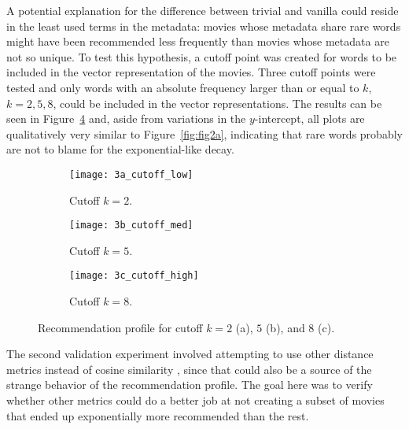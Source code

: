 
A potential explanation for the difference between trivial and vanilla could
reside in the least used terms in the metadata: movies whose metadata share rare
words might have been recommended less frequently than movies whose metadata are
not so unique. To test this hypothesis, a cutoff point was created for words to
be included in the vector representation of the movies. Three cutoff points were
tested and only words with an absolute frequency larger than or equal to $k$, $k
= {2, 5, 8}$, could be included in the vector representations. The results can
be seen in Figure~\ref{fig:fig3} and, aside from variations in the
$y$-intercept, all plots are qualitatively very similar to
Figure~\ref{fig:fig2a}, indicating that rare words probably are not to blame for
the exponential-like decay.

\begin{figure}
  \centering
  \begin{subfigure}{0.3\textwidth}
    \centering
    \texttt{[image: 3a\_cutoff\_low]}
    \caption{Cutoff $k = 2$.\label{fig:fig3a}}
  \end{subfigure}
  \begin{subfigure}{0.3\textwidth}
    \centering
    \texttt{[image: 3b\_cutoff\_med]}
    \caption{Cutoff $k = 5$.\label{fig:fig3b}}
  \end{subfigure}
  \begin{subfigure}{0.3\textwidth}
    \centering
    \texttt{[image: 3c\_cutoff\_high]}
    \caption{Cutoff $k = 8$.\label{fig:fig3c}}
  \end{subfigure}
  \caption{Recommendation profile for cutoff $k = 2$ (a), $5$ (b), and $8$
    (c).\label{fig:fig3}}
\end{figure}

The second validation experiment involved attempting to use other distance
metrics instead of cosine similarity \citep{ricci_introduction_2011}, since that
could also be a source of the strange behavior of the recommendation profile.
The goal here was to verify whether other metrics could do a better job at not
creating a subset of movies that ended up exponentially more recommended than
the rest.

